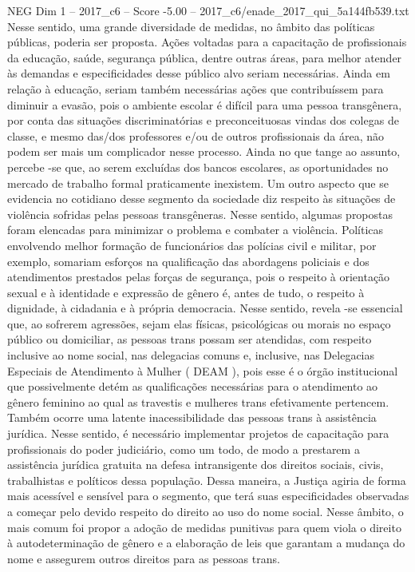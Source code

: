 \begin{textsample}{NEG Dim 1 – 2017\_c6 – Score -5.00 – 2017\_c6/enade\_2017\_qui\_5a144fb539.txt}
Nesse sentido, uma grande diversidade de medidas, no âmbito das políticas públicas, poderia ser proposta.
Ações voltadas para a capacitação de profissionais da educação, saúde, segurança pública, dentre outras áreas, para melhor atender às demandas e especificidades desse público alvo seriam necessárias.
Ainda em relação à educação, seriam também necessárias ações que contribuíssem para diminuir a evasão, pois o ambiente escolar é difícil para uma pessoa transgênera, por conta das situações discriminatórias e preconceituosas vindas dos colegas de classe, e mesmo das/dos professores e/ou de outros profissionais da área, não podem ser mais um complicador nesse processo.
Ainda no que tange ao assunto, percebe -se que, ao serem excluídas dos bancos escolares, as oportunidades no mercado de trabalho formal praticamente inexistem.
Um outro aspecto que se evidencia no cotidiano desse segmento da sociedade diz respeito às situações de violência sofridas pelas pessoas transgêneras.
Nesse sentido, algumas propostas foram elencadas para minimizar o problema e combater a violência.
Políticas envolvendo melhor formação de funcionários das polícias civil e militar, por exemplo, somariam esforços na qualificação das abordagens policiais e dos atendimentos prestados pelas forças de segurança, pois o respeito à orientação sexual e à identidade e expressão de gênero é, antes de tudo, o respeito à dignidade, à cidadania e à própria democracia.
Nesse sentido, revela -se essencial que, ao sofrerem agressões, sejam elas físicas, psicológicas ou morais no espaço público ou domiciliar, as pessoas trans possam ser atendidas, com respeito inclusive ao nome social, nas delegacias comuns e, inclusive, nas Delegacias Especiais de Atendimento à Mulher ( DEAM ), pois esse é o órgão institucional que possivelmente detém as qualificações necessárias para o atendimento ao gênero feminino ao qual as travestis e mulheres trans efetivamente pertencem.
Também ocorre uma latente inacessibilidade das pessoas trans à assistência jurídica.
Nesse sentido, é necessário implementar projetos de capacitação para profissionais do poder judiciário, como um todo, de modo a prestarem a assistência jurídica gratuita na defesa intransigente dos direitos sociais, civis, trabalhistas e políticos dessa população.
Dessa maneira, a Justiça agiria de forma mais acessível e sensível para o segmento, que terá suas especificidades observadas a começar pelo devido respeito do direito ao uso do nome social.
Nesse âmbito, o mais comum foi propor a adoção de medidas punitivas para quem viola o direito à autodeterminação de gênero e a elaboração de leis que garantam a mudança do nome e assegurem outros direitos para as pessoas trans.

\end{textsample}
